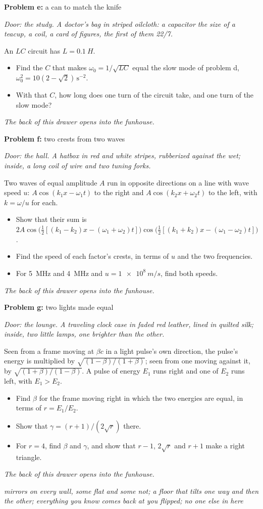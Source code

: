 \documentclass[11pt]{article}
\newcommand{\scene}[1]{\par{\itshape #1}\par}
\newcommand{\problem}[2]{\par\medskip\textbf{Problem #1:} #2\par\nopagebreak}
\newcommand{\appx}[2]{\clearpage{\Large\bfseries Appendix #1: #2}\par\medskip}
\newenvironment{parts}{\begin{itemize}[leftmargin=3.4em,labelwidth=2.8em,labelsep=0.6em,align=left,itemsep=2pt,topsep=3pt]}{\end{itemize}}
\newcommand{\pt}[1]{\item[\textbf{#1}]}
\begin{document}
\problem{e}{a can to match the knife}
\scene{Door: the study. A doctor's bag in striped oilcloth: a capacitor the size of a teacup, a coil, a card of figures, the first of them 22/7.}
An $LC$ circuit has $L = \SI{0.1}{H}$.
\begin{parts}
\pt{e-1} Find the $C$ that makes $\omega_0 = 1/\sqrt{LC}$ equal the slow mode of problem d, $\omega_0^2 = 10(2 - \sqrt2)\,\mathrm{s^{-2}}$.
\pt{e-2} With that $C$, how long does one turn of the circuit take, and one turn of the slow mode?
\end{parts}
\scene{The back of this drawer opens into the funhouse.}

\problem{f}{two crests from two waves}
\scene{Door: the hall. A hatbox in red and white stripes, rubberized against the wet; inside, a long coil of wire and two tuning forks.}
Two waves of equal amplitude $A$ run in opposite directions on a line with wave speed $u$: $A\cos(k_1x - \omega_1t)$ to the right and $A\cos(k_2x + \omega_2t)$ to the left, with $k = \omega/u$ for each.
\begin{parts}
\pt{f-1} Show that their sum is $2A\cos\bigl(\tfrac12[(k_1 - k_2)x - (\omega_1 + \omega_2)t]\bigr)\cos\bigl(\tfrac12[(k_1 + k_2)x - (\omega_1 - \omega_2)t]\bigr)$.
\pt{f-2} Find the speed of each factor's crests, in terms of $u$ and the two frequencies.
\pt{f-3} For \SI{5}{MHz} and \SI{4}{MHz} and $u = \SI{1e8}{m/s}$, find both speeds.
\end{parts}
\scene{The back of this drawer opens into the funhouse.}

\problem{g}{two lights made equal}
\scene{Door: the lounge. A traveling clock case in faded red leather, lined in quilted silk; inside, two little lamps, one brighter than the other.}
Seen from a frame moving at $\beta c$ in a light pulse's own direction, the pulse's energy is multiplied by $\sqrt{(1 - \beta)/(1 + \beta)}$; seen from one moving against it, by $\sqrt{(1 + \beta)/(1 - \beta)}$. A pulse of energy $E_1$ runs right and one of $E_2$ runs left, with $E_1 > E_2$.
\begin{parts}
\pt{g-1} Find $\beta$ for the frame moving right in which the two energies are equal, in terms of $r = E_1/E_2$.
\pt{g-2} Show that $\gamma = (r + 1)/(2\sqrt r)$ there.
\pt{g-3} For $r = 4$, find $\beta$ and $\gamma$, and show that $r - 1$, $2\sqrt r$ and $r + 1$ make a right triangle.
\end{parts}
\scene{The back of this drawer opens into the funhouse.}

\appx{2}{the funhouse}
\scene{mirrors on every wall, some flat and some not; a floor that tilts one way and then the other; everything you know comes back at you flipped; no one else in here}
\end{document}
